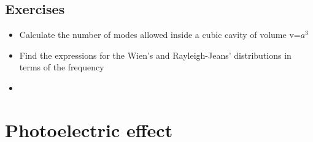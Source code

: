 \documentclass{article}
\begin{document}
\subsection{Exercises}
\begin{itemize}
  \item Calculate the number of modes allowed inside a cubic cavity of volume v=$a^3$ 
  \item Find the expressions for the Wien's and Rayleigh-Jeans' distributions in terms of the frequency
  \item 
\end{itemize}

\section{Photoelectric effect}
\end{document}
